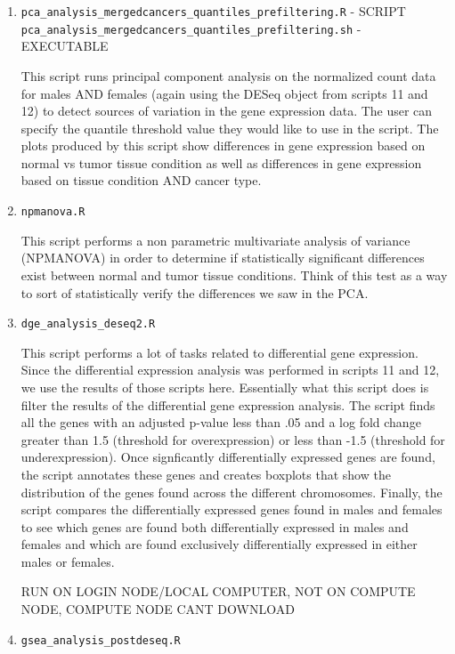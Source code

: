 \documentclass[10pt]{article}
\begin{document}
\begin{enumerate}
\item\texttt{pca\_analysis\_mergedcancers\_quantiles\_prefiltering.R} - SCRIPT\newline
\texttt{pca\_analysis\_mergedcancers\_quantiles\_prefiltering.sh} - EXECUTABLE

This script runs principal component analysis on the normalized count data for males AND females (again using the DESeq object from scripts 11 and 12) to detect sources of variation in the gene expression data. The user can specify the quantile threshold value they would like to use in the script. The plots produced by this script show differences in gene expression based on normal vs tumor tissue condition as well as differences in gene expression based on tissue condition AND cancer type.

\item\texttt{npmanova.R}

This script performs a non parametric multivariate analysis of variance (NPMANOVA) in order to determine if statistically significant differences exist between normal and tumor tissue conditions. Think of this test as a way to sort of statistically verify the differences we saw in the PCA.
	
\item\texttt{dge\_analysis\_deseq2.R}
	
This script performs a lot of tasks related to differential gene expression. Since the differential expression analysis was performed in scripts 11 and 12, we use the results of those scripts here. Essentially what this script does is filter the results of the differential gene expression analysis. The script finds all the genes with an adjusted p-value less than .05 and a log fold change greater than 1.5 (threshold for overexpression) or less than -1.5 (threshold for underexpression). Once signficantly differentially expressed genes are found, the script annotates these genes and creates boxplots that show the distribution of the genes found across the different chromosomes. Finally, the script compares the differentially expressed genes found in males and females to see which genes are found both differentially expressed in males and females and which are found exclusively differentially expressed in either males or females.

RUN ON LOGIN NODE/LOCAL COMPUTER, NOT ON COMPUTE NODE, COMPUTE NODE CANT DOWNLOAD
	
\item\texttt{gsea\_analysis\_postdeseq.R}
	

\end{enumerate}
\end{document}
